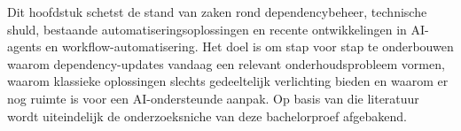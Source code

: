 





Dit hoofdstuk schetst de stand van zaken rond dependencybeheer, technische shuld, bestaande automatiseringsoplossingen en recente ontwikkelingen in AI-agents en workflow-automatisering. Het doel is om stap voor stap te onderbouwen waarom dependency-updates vandaag een relevant onderhoudsprobleem vormen, waarom klassieke oplossingen slechts gedeeltelijk verlichting bieden en waarom er nog ruimte is voor een AI-ondersteunde aanpak. Op basis van die literatuur wordt uiteindelijk de onderzoeksniche van deze bachelorproef afgebakend.

